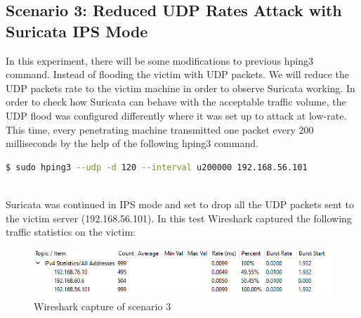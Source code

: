 \subsection{Scenario 3: Reduced UDP Rates Attack with Suricata IPS Mode}
In this experiment, there will be some modifications to previous hping3 command. Instead of flooding the victim with UDP packets. We will reduce the UDP packets rate to the victim machine in order to observe Suricata working. In order to check how Suricata can behave with the acceptable traffic volume, the UDP flood was configured differently where it was set up to attack at low-rate. This time, every penetrating machine transmitted one packet every 200 milliseconds by the help of the following hping3 command.
\begin{lstlisting}[language=bash,caption={Modified ddos.sh}]
$ sudo hping3 --udp -d 120 --interval u200000 192.168.56.101
\end{lstlisting}
\\
Suricata was continued in IPS mode and set to drop all the UDP packets sent to the victim server (192.168.56.101). In this test Wireshark captured the following traffic statistics on the victim:
\begin{figure}[!htb]
    \centering
    \includegraphics[width=0.8\linewidth]{thesis/s3Wireshark.png}
    \caption{Wireshark capture of scenario 3}
    \label{fig:enter-label}
\end{figure}
\begin{table}[!htb]
    \centering
    \caption{Wireshark statistics of scenario 3}
    \label{tab:my_label}
\end{table}
